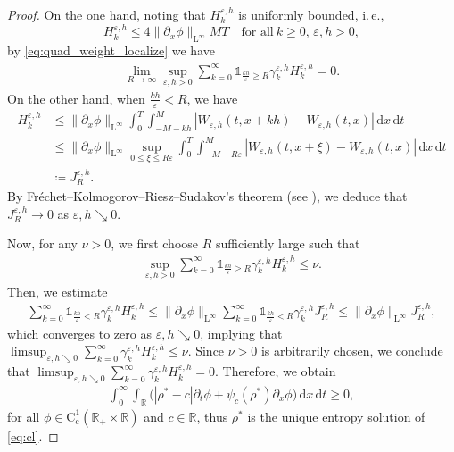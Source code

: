 \documentclass[10pt]{amsart}
\theoremstyle{plain}
\theoremstyle{definition}
\numberwithin{equation}{section}
\newcommand{\eps}{{\varepsilon}}
\newcommand{\dt}{{\, \mathrm{d}t}}
\newcommand{\dx}{{\, \mathrm{d}x}}
\newcommand{\dd}{\,\mathrm{d}}
\begin{document}
\begin{proof}
On the one hand, noting that $H^{\eps,h}_k$ is uniformly bounded, i.\,e.,
$$
H^{\eps,h}_k \le 4 \|\partial_x \phi\|_{\mathrm{L}^\infty} MT \quad \text{for all}\ k\geq0,\,\eps,h>0,
$$
by \cref{eq:quad_weight_localize} we have
\begin{align*}
    \lim_{R\to\infty} \sup_{\eps,h>0}  \sum_{k=0}^\infty \mathds{1}_{\frac{kh}\eps\ge R}\gamma_k^{\eps,h} H^{\eps,h}_k  = 0.
\end{align*}
On the other hand, when $\frac{kh}\eps< R$, we have
\begin{align*}
    H^{\eps,h}_k &\le \|\partial_x \phi\|_{\mathrm{L}^\infty} \int_0^T\int_{-M-kh}^M |W_{\eps,h}(t,x+kh)-W_{\eps,h}(t,x)| \dx\dt \\
    &\leq \|\partial_x \phi\|_{\mathrm{L}^\infty} \sup_{0\le\xi\le R\eps} \int_0^T\int_{-M-R\eps}^M |W_{\eps,h}(t,x+\xi)-W_{\eps,h}(t,x)| \dx\dt \\
    &\coloneqq J^{\eps,h}_R.
\end{align*}
By Fréchet--Kolmogorov--Riesz--Sudakov's theorem (see \cite{zbMATH05817642,zbMATH06579393,zbMATH07077498}), we deduce that $J^{\eps,h}_R\to0$ as $\eps,h\searrow0$. 

Now, for any $\nu>0$, we first choose $R$ sufficiently large such that
\begin{align*}
    \sup_{\eps,h>0} \sum_{k=0}^\infty \mathds{1}_{\frac{kh}\eps\ge R}\gamma_k^{\eps,h} H^{\eps,h}_k \leq \nu.
\end{align*}
Then, we estimate
\begin{align*}
    \sum_{k=0}^\infty \mathds{1}_{\frac{kh}\eps< R}\gamma_k^{\eps,h} H^{\eps,h}_k  \leq \|\partial_x \phi\|_{\mathrm{L}^\infty} \sum_{k=0}^\infty \mathds{1}_{\frac{kh}\eps< R}\gamma_k^{\eps,h} J^{\eps,h}_R \le \|\partial_x \phi\|_{\mathrm{L}^\infty} J^{\eps,h}_R,
\end{align*}
which converges to zero as $\eps,h\searrow0$, implying that $\limsup_{\eps,h\searrow0} \sum_{k=0}^\infty \gamma_k^{\eps,h} H^{\eps,h}_k \le \nu$.
Since $\nu>0$ is arbitrarily chosen, we conclude that $\limsup_{\eps,h\searrow0} \sum_{k=0}^\infty \gamma_k^{\eps,h} H^{\eps,h}_k=0$.
Therefore, we obtain
\begin{align*}
    \int_0^\infty\int_{\mathbb{R}} \big( |\rho^\ast-c|\partial_t\phi + \psi_c(\rho^\ast)\partial_x\phi \big) \dd x\dd t \geq 0,
\end{align*}
for all $\phi\in \mathrm{C}_{\mathrm{c}}^1(\mathbb{R}_+\times\mathbb{R})$ and $c\in\mathbb{R}$, thus $\rho^\ast$ is the unique entropy solution of \cref{eq:cl}.
\end{proof}
\end{document}
